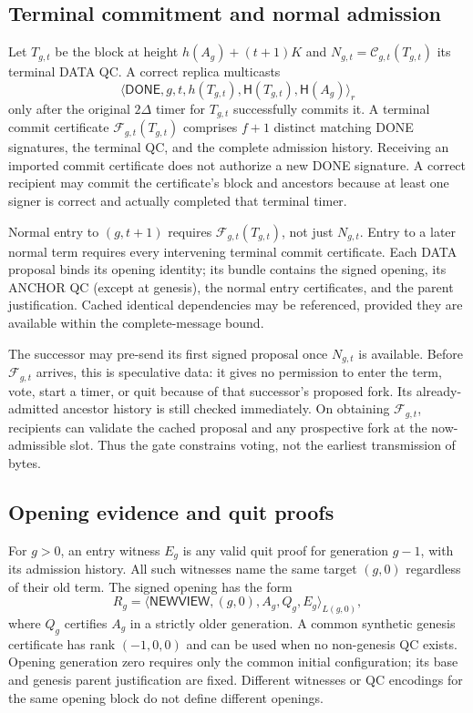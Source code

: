 \documentclass[11pt,a4paper]{article}
\newcommand{\QC}{\mathcal C}
\newcommand{\DC}{\mathcal F}
\newcommand{\Hash}{\mathsf H}
\newcommand{\tagg}[1]{\mathsf{#1}}
\begin{document}
\subsection{Terminal commitment and normal admission}
\label{sec:done}
Let $T_{g,t}$ be the block at height $h(A_g)+(t+1)K$ and
$N_{g,t}=\QC_{g,t}(T_{g,t})$ its terminal DATA QC. A correct replica
multicasts
\[
 \langle\tagg{DONE},g,t,h(T_{g,t}),\Hash(T_{g,t}),
             \Hash(A_g)\rangle_r
\]
only after the original $2\Delta$ timer for $T_{g,t}$ successfully commits
it. A terminal commit certificate $\DC_{g,t}(T_{g,t})$ comprises $f+1$
distinct matching DONE signatures, the terminal QC, and the complete
admission history. Receiving an imported commit certificate does not
authorize a new DONE signature. A correct recipient may commit the
certificate's block and ancestors because at least one signer is correct
and actually completed that terminal timer.

Normal entry to $(g,t+1)$ requires $\DC_{g,t}(T_{g,t})$, not just $N_{g,t}$.
Entry to a later normal term requires every intervening terminal commit
certificate. Each DATA proposal binds its opening identity; its bundle
contains the signed opening, its ANCHOR QC (except at genesis), the normal
entry certificates, and the parent justification. Cached identical
dependencies may be referenced, provided they are available within the
complete-message bound.

The successor may pre-send its first signed proposal once $N_{g,t}$ is
available. Before $\DC_{g,t}$ arrives, this is speculative data: it gives no
permission to enter the term, vote, start a timer, or quit because of that
successor's proposed fork. Its already-admitted ancestor history is still
checked immediately. On obtaining $\DC_{g,t}$, recipients can validate the
cached proposal and any prospective fork at the now-admissible slot.
Thus the gate constrains voting, not the earliest transmission of bytes.

\subsection{Opening evidence and quit proofs}
\label{sec:evidence}
For $g>0$, an entry witness $E_g$ is any valid quit proof for generation
$g-1$, with its admission history. All such witnesses name the same target
$(g,0)$ regardless of their old term. The signed opening has the form
\[
 R_g=\langle\tagg{NEWVIEW},(g,0),A_g,Q_g,E_g\rangle_{L(g,0)},
\]
where $Q_g$ certifies $A_g$ in a strictly older generation. A common
synthetic genesis certificate has rank $(-1,0,0)$ and can be used when no
non-genesis QC exists. Opening generation zero requires only the common
initial configuration; its base and genesis parent justification are fixed.
Different witnesses or QC encodings for the same opening block do not
define different openings.
\end{document}
